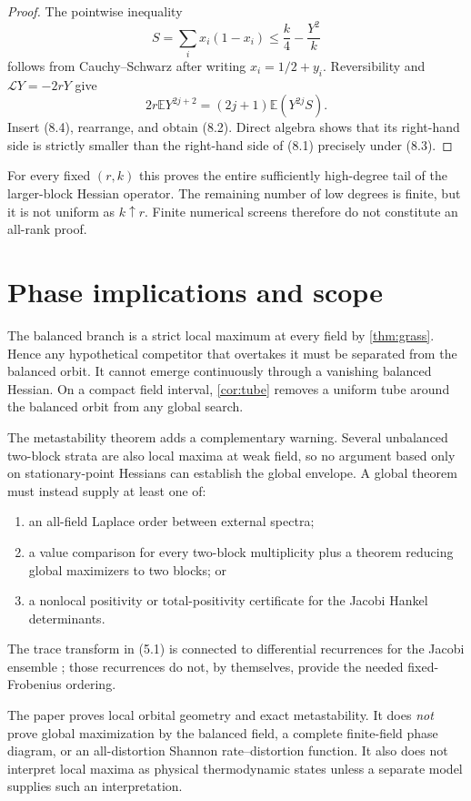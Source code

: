 \documentclass[11pt]{article}
\newcommand{\E}{\mathbb E}
\newcommand{\cL}{\mathcal L}
\begin{document}
\begin{proof}
The pointwise inequality
\[
 S=\sum_i x_i(1-x_i)\le\frac k4-\frac{Y^2}{k}               \tag{8.4}
\]
follows from Cauchy--Schwarz after writing $x_i=1/2+y_i$.
Reversibility and $\cL Y=-2rY$ give
\[
 2r\E Y^{2j+2}=(2j+1)\E(Y^{2j}S).
\]
Insert (8.4), rearrange, and obtain (8.2).  Direct algebra shows
that its right-hand side is strictly smaller than the right-hand side of
(8.1) precisely under (8.3).
\end{proof}

For every fixed $(r,k)$ this proves the entire sufficiently high-degree tail
of the larger-block Hessian operator.  The remaining number of low degrees
is finite, but it is not uniform as $k\uparrow r$.  Finite numerical screens
therefore do not constitute an all-rank proof.

\section{Phase implications and scope}

The balanced branch is a strict local maximum at every field by
\cref{thm:grass}.  Hence any hypothetical competitor that overtakes it must
be separated from the balanced orbit.  It cannot emerge continuously through
a vanishing balanced Hessian.  On a compact field interval,
\cref{cor:tube} removes a uniform tube around the balanced orbit from any
global search.

The metastability theorem adds a complementary warning.  Several unbalanced
two-block strata are also local maxima at weak field, so no argument based
only on stationary-point Hessians can establish the global envelope.  A
global theorem must instead supply at least one of:
\begin{enumerate}[label=(\alph*)]
\item an all-field Laplace order between external spectra;
\item a value comparison for every two-block multiplicity plus a theorem
reducing global maximizers to two blocks; or
\item a nonlocal positivity or total-positivity certificate for the Jacobi
Hankel determinants.
\end{enumerate}
The trace transform in (5.1) is connected to differential recurrences
for the Jacobi ensemble \cite{ForresterKumar2022}; those recurrences do not,
by themselves, provide the needed fixed-Frobenius ordering.

The paper proves local orbital geometry and exact metastability.  It does
\emph{not} prove global maximization by the balanced field, a complete
finite-field phase diagram, or an all-distortion Shannon rate--distortion
function.  It also does not interpret local maxima as physical thermodynamic
states unless a separate model supplies such an interpretation.
\end{document}
